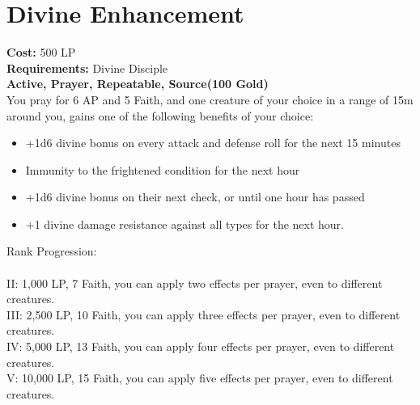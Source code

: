 \section{Divine Enhancement}\label{prayer:divineEnhancement}
\textbf{Cost:} 500 LP\\
\textbf{Requirements:} Divine Disciple \\
\textbf{Active, Prayer, Repeatable, Source(100 Gold)}\\
You pray for 6 AP and 5 Faith, and one creature of your choice in a range of 15m around you, gains one of the following benefits of your choice:
\begin{itemize}
	\item +1d6 divine bonus on every attack and defense roll for the next 15 minutes
	\item Immunity to the frightened condition for the next hour
	\item +1d6 divine bonus on their next check, or until one hour has passed
	\item +1 divine damage resistance against all types for the next hour.
\end{itemize}

Rank Progression:\\
\\
II: 1,000 LP, 7 Faith, you can apply two effects per prayer, even to different creatures.\\
III: 2,500 LP, 10 Faith, you can apply three effects per prayer, even to different creatures.\\
IV: 5,000 LP, 13 Faith, you can apply four effects per prayer, even to different creatures.\\
V: 10,000 LP, 15 Faith, you can apply five effects per prayer, even to different creatures.\\